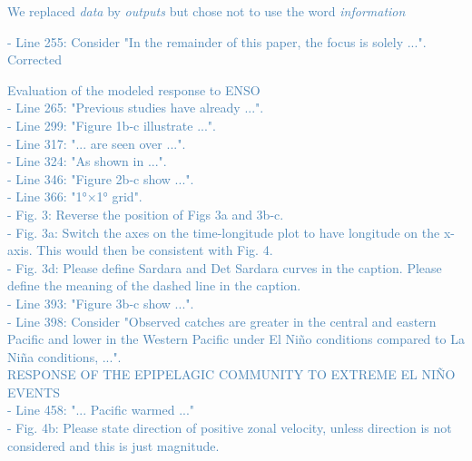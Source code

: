 \documentclass[12pt]{article}
\newcommand{\resp}[1]{\textcolor{SteelBlue}{#1}}
\begin{document}
\resp{We replaced \emph{data} by \emph{outputs} but chose not to use the word \emph{information}

- Line 255: Consider "In the remainder of this paper, the focus is solely ...".\\

\resp{Corrected}

Evaluation of the modeled response to ENSO\\

- Line 265: "Previous studies have already ...".\\

- Line 299: "Figure 1b-c illustrate ...".\\

- Line 317: "... are seen over ...".\\

- Line 324: "As shown in ...".\\

- Line 346: "Figure 2b-c show ...".\\

- Line 366: "1°×1° grid".\\

- Fig. 3: Reverse the position of Figs 3a and 3b-c.\\

- Fig. 3a: Switch the axes on the time-longitude plot to have longitude on the x-axis. This would then be consistent with Fig. 4.\\

- Fig. 3d: Please define Sardara and Det Sardara curves in the caption. Please define the meaning of the dashed line in the caption.\\

- Line 393: "Figure 3b-c show ...".\\

- Line 398: Consider "Observed catches are greater in the central and eastern Pacific and lower in the Western Pacific under El Niño conditions compared to La Niña conditions, ...".\\

RESPONSE OF THE EPIPELAGIC COMMUNITY TO EXTREME EL NIÑO EVENTS\\

- Line 458: "... Pacific warmed ..."\\

- Fig. 4b: Please state direction of positive zonal velocity, unless direction is not considered and this is just magnitude.\\

}
\end{document}
